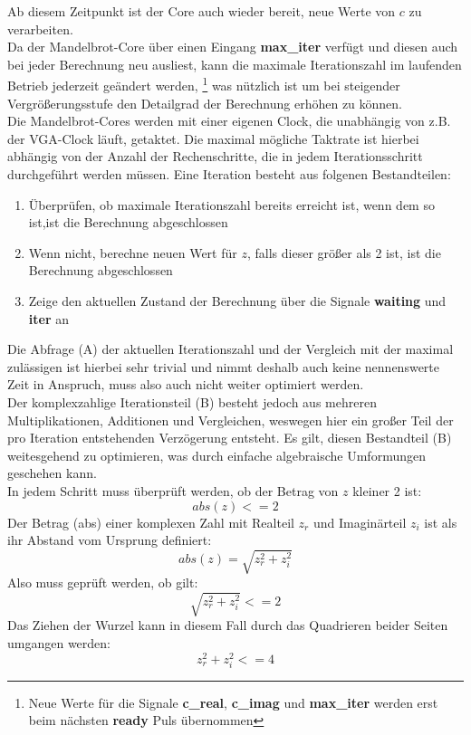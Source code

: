\documentclass[a4paper,12pt,onesided]{report}
\begin{document}
Ab diesem Zeitpunkt ist der Core auch wieder bereit, neue Werte von $c$ zu verarbeiten.\\
Da der Mandelbrot-Core über einen Eingang \textbf{max\_iter} verfügt und diesen auch bei jeder Berechnung neu ausliest, kann die maximale Iterationszahl im laufenden Betrieb jederzeit geändert werden,
\footnote{Neue Werte für die Signale \textbf{c\_real}, \textbf{c\_imag} und \textbf{max\_iter} werden erst beim nächsten \textbf{ready} Puls übernommen}
was nützlich ist um bei steigender Vergrößerungsstufe den Detailgrad der Berechnung erhöhen zu können.\\
Die Mandelbrot-Cores werden mit einer eigenen Clock, die unabhängig von z.B. der VGA-Clock läuft, getaktet.
Die maximal mögliche Taktrate ist hierbei abhängig von der Anzahl der Rechenschritte, die in jedem Iterationsschritt durchgeführt werden müssen.
Eine Iteration besteht aus folgenen Bestandteilen:
\begin{enumerate}[label=(\Alph*)]
	\item Überprüfen, ob maximale Iterationszahl bereits erreicht ist, wenn dem so ist,ist die Berechnung abgeschlossen
	\item Wenn nicht, berechne neuen Wert für $z$, falls dieser größer als 2 ist, ist die Berechnung abgeschlossen
	\item Zeige den aktuellen Zustand der Berechnung über die Signale \textbf{waiting} und \textbf{iter} an
\end{enumerate}
Die Abfrage (A) der aktuellen Iterationszahl und der Vergleich mit der maximal zulässigen ist hierbei sehr trivial und nimmt deshalb auch keine nennenswerte Zeit in Anspruch, muss also auch nicht weiter optimiert werden.\\
Der komplexzahlige Iterationsteil (B) besteht jedoch aus mehreren Multiplikationen, Additionen und Vergleichen, weswegen hier ein großer Teil der pro Iteration entstehenden Verzögerung entsteht.
Es gilt, diesen Bestandteil (B) weitesgehend zu optimieren, was durch einfache algebraische Umformungen geschehen kann.\\
In jedem Schritt muss überprüft werden, ob der Betrag von $z$ kleiner 2 ist:
\[abs(z) <= 2\]
Der Betrag (abs) einer komplexen Zahl mit Realteil $z_r$ und Imaginärteil $z_i$ ist als ihr Abstand vom Ursprung definiert:
\[abs(z) = \sqrt{z_r^2 + z_i^2}\]
Also muss geprüft werden, ob gilt:
\[\sqrt{z_r^2 + z_i^2} <= 2\]
Das Ziehen der Wurzel kann in diesem Fall durch das Quadrieren beider Seiten umgangen werden:
\begin{equation}
	\label{eq:bedingung}
	z_r^2 + z_i^2 <= 4
\end{equation}
\end{document}
